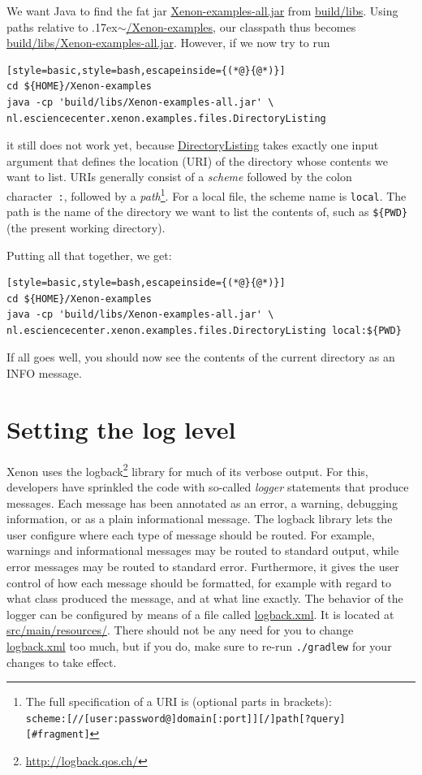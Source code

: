 \documentclass[12pt, a4paper, twoside, openany, titlepage]{book}
\newcommand{\mytilde}{\raise.17ex\hbox{$\scriptstyle\sim$}}
\begin{document}
We want Java to find the fat jar \url{Xenon-examples-all.jar} from \url{build/libs}. Using paths relative to \mytilde\url{/Xenon-examples}, our classpath thus becomes \url{build/libs/Xenon-examples-all.jar}. However, if we now try to run
\begin{lstlisting}[style=basic,style=bash,escapeinside={(*@}{@*)}]
cd ${HOME}/Xenon-examples
java -cp 'build/libs/Xenon-examples-all.jar' \
nl.esciencecenter.xenon.examples.files.DirectoryListing
\end{lstlisting}
it still does not work yet, because \url{DirectoryListing} takes exactly one input argument that defines the location (URI) of the directory whose contents we want to list. URIs generally consist of a \textit{scheme} followed by the colon character~\texttt{:}, followed by a \textit{path}\footnote{The full specification of a URI is (optional parts in brackets): \\ \texttt{scheme:[//[user:password@]domain[:port]][/]path[?query][#fragment]}\label{footnote:format-uri}}. For a local file, the scheme name is \texttt{local}. The path is the name of the directory we want to list the contents of, such as \texttt{\$\{PWD\}} (the present working directory).

Putting all that together, we get:

\begin{lstlisting}[style=basic,style=bash,escapeinside={(*@}{@*)}]
cd ${HOME}/Xenon-examples
java -cp 'build/libs/Xenon-examples-all.jar' \
nl.esciencecenter.xenon.examples.files.DirectoryListing local:${PWD}
\end{lstlisting} \label{snip:directory-listing-local}

If all goes well, you should now see the contents of the current directory as an INFO message.


\section{Setting the log level}
\label{sec:setting-the-log-level-command-line}

Xenon uses the logback\footnote{\url{http://logback.qos.ch/}} library for much of its verbose output. For this, developers have sprinkled the code with so-called \textit{logger} statements that produce messages. Each message has been annotated as an error, a warning, debugging information, or as a plain informational message. The logback library lets the user configure where each type of message should be routed. For example, warnings and informational messages may be routed to standard output, while error messages may be routed to standard error. Furthermore, it gives the user control of how each message should be formatted, for example with regard to what class produced the message, and at what line exactly. The behavior of the logger can be configured by means of a file called \url{logback.xml}. It is located at \url{src/main/resources/}. There should not be any need for you to change \url{logback.xml} too much, but if you do, make sure to re-run \texttt{./gradlew} for your changes to take effect.
\end{document}

